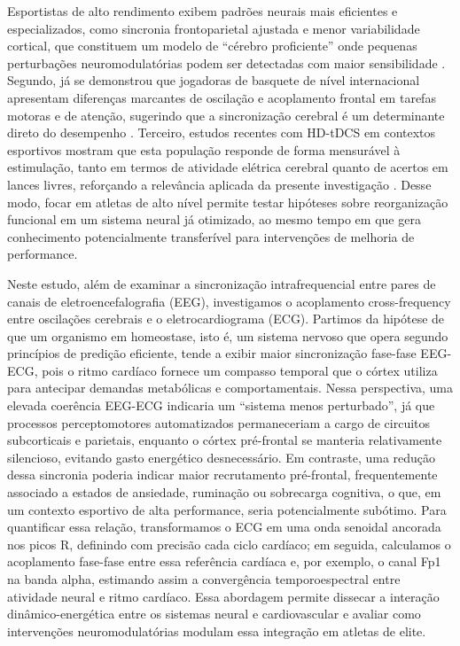 Esportistas de alto rendimento exibem padrões neurais mais eficientes e especializados, como sincronia frontoparietal ajustada e menor variabilidade cortical, que constituem um modelo de ``cérebro proficiente'' onde pequenas perturbações neuromodulatórias podem ser detectadas com maior sensibilidade \cite{yarrow2009inside,bertollo2016proficient}. Segundo, já se demonstrou que jogadoras de basquete de nível internacional apresentam diferenças marcantes de oscilação e acoplamento frontal em tarefas motoras e de atenção, sugerindo que a sincronização cerebral é um determinante direto do desempenho \cite{chuang2013differences}. Terceiro, estudos recentes com HD-tDCS em contextos esportivos mostram que esta população responde de forma mensurável à estimulação, tanto em termos de atividade elétrica cerebral quanto de acertos em lances livres, reforçando a relevância aplicada da presente investigação \cite{moscaleski2022hdtdcs}. Desse modo, focar em atletas de alto nível permite testar hipóteses sobre reorganização funcional em um sistema neural já otimizado, ao mesmo tempo em que gera conhecimento potencialmente transferível para intervenções de melhoria de performance.

Neste estudo, além de examinar a sincronização intrafrequencial entre pares de canais de eletroencefalografia (EEG), investigamos o acoplamento cross-frequency entre oscilações cerebrais e o eletrocardiograma (ECG). Partimos da hipótese de que um organismo em homeostase, isto é, um sistema nervoso que opera segundo princípios de predição eficiente, tende a exibir maior sincronização fase-fase EEG-ECG, pois o ritmo cardíaco fornece um compasso temporal que o córtex utiliza para antecipar demandas metabólicas e comportamentais. Nessa perspectiva, uma elevada coerência EEG-ECG indicaria um ``sistema menos perturbado'', já que processos perceptomotores automatizados permaneceriam a cargo de circuitos subcorticais e parietais, enquanto o córtex pré-frontal se manteria relativamente silencioso, evitando gasto energético desnecessário. Em contraste, uma redução dessa sincronia poderia indicar maior recrutamento pré-frontal, frequentemente associado a estados de ansiedade, ruminação ou sobrecarga cognitiva, o que, em um contexto esportivo de alta performance, seria potencialmente subótimo. Para quantificar essa relação, transformamos o ECG em uma onda senoidal ancorada nos picos R, definindo com precisão cada ciclo cardíaco; em seguida, calculamos o acoplamento fase-fase entre essa referência cardíaca e, por exemplo, o canal Fp1 na banda alpha, estimando assim a convergência temporoespectral entre atividade neural e ritmo cardíaco. Essa abordagem permite dissecar a interação dinâmico-energética entre os sistemas neural e cardiovascular e avaliar como intervenções neuromodulatórias modulam essa integração em atletas de elite.

